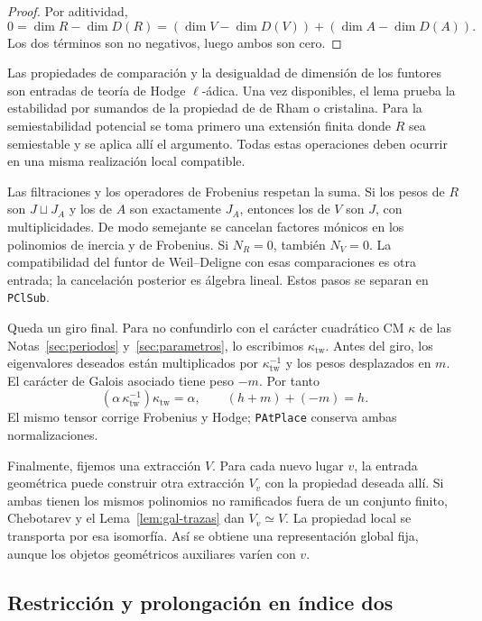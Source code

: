 \begin{proof}
Por aditividad,
\[
 0=\dim R-\dim D(R)
   =(\dim V-\dim D(V))+(\dim A-\dim D(A)).
\]
Los dos términos son no negativos, luego ambos son cero.
\end{proof}

Las propiedades de comparación y la desigualdad de dimensión
de los funtores son entradas de teoría de Hodge $\ell$-ádica.
Una vez disponibles, el lema prueba la estabilidad por sumandos
de la propiedad de de Rham o cristalina.
Para la semiestabilidad potencial se toma primero una extensión
finita donde $R$ sea semiestable y se aplica allí el argumento.
Todas estas operaciones deben ocurrir en una misma realización
local compatible.

Las filtraciones y los operadores de Frobenius respetan la suma.
Si los pesos de $R$ son $J\sqcup J_A$ y los de $A$ son exactamente
$J_A$, entonces los de $V$ son $J$, con multiplicidades.
De modo semejante se cancelan factores mónicos en los polinomios
de inercia y de Frobenius. Si $N_R=0$, también $N_V=0$.
La compatibilidad del funtor de Weil--Deligne con esas comparaciones
es otra entrada; la cancelación posterior es álgebra lineal.
Estos pasos se separan en \texttt{PClSub}.

Queda un giro final. Para no confundirlo con el carácter cuadrático
CM $\kappa$ de las Notas~\ref{sec:periodos} y~\ref{sec:parametros},
lo escribimos $\kappa_{\mathrm{tw}}$.
Antes del giro, los eigenvalores deseados están multiplicados por
$\kappa_{\mathrm{tw}}^{-1}$ y los pesos desplazados en $m$.
El carácter de Galois asociado tiene peso $-m$. Por tanto
\begin{equation}
 (\alpha\,\kappa_{\mathrm{tw}}^{-1})
       \kappa_{\mathrm{tw}}=\alpha,\qquad
 (h+m)+(-m)=h.
 \label{eq:gal-giro}
\end{equation}
El mismo tensor corrige Frobenius y Hodge;
\texttt{PAtPlace} conserva ambas normalizaciones.

Finalmente, fijemos una extracción $V$. Para cada nuevo lugar $v$,
la entrada geométrica puede construir otra extracción $V_v$
con la propiedad deseada allí. Si ambas tienen los mismos
polinomios no ramificados fuera de un conjunto finito,
Chebotarev y el Lema~\ref{lem:gal-trazas} dan $V_v\simeq V$.
La propiedad local se transporta por esa isomorfía.
Así se obtiene una representación global fija, aunque los
objetos geométricos auxiliares varíen con $v$.

\subsection{Restricción y prolongación en índice dos}

